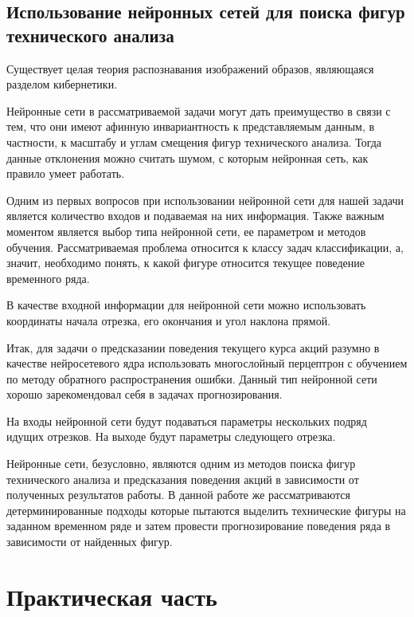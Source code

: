 \documentclass[bachelor, och, coursework]{SCWorks}
\begin{document}
        \subsection{Использование нейронных сетей для поиска фигур технического анализа}
        Существует целая теория распознавания изображений образов, являющаяся
        разделом кибернетики.

        Нейронные сети в рассматриваемой задачи могут дать преимущество в связи
        с тем, что они имеют афинную инвариантность к представляемым данным, в
        частности, к масштабу и углам смещения фигур технического анализа. Тогда
        данные отклонения можно считать шумом, с которым нейронная сеть, как
        правило умеет работать. 

        Одним из первых вопросов при использовании нейронной сети для нашей
        задачи является количество входов и подаваемая на них информация. Также
        важным моментом является выбор типа нейронной сети, ее параметром и
        методов обучения. Рассматриваемая проблема относится к классу задач
        классификации, а, значит, необходимо понять, к какой фигуре относится
        текущее поведение временного ряда.

        В качестве входной информации для нейронной сети можно использовать
        координаты начала отрезка, его окончания и угол наклона прямой. 

        Итак, для задачи о предсказании поведения текущего курса акций разумно в
        качестве нейросетевого ядра использовать многослойный перцептрон с
        обучением по методу обратного распространения ошибки. Данный тип
        нейронной сети хорошо зарекомендовал себя в задачах прогнозирования.

        На входы нейронной сети будут подаваться параметры нескольких подряд
        идущих отрезков. На выходе будут параметры следующего отрезка.
        
        Нейронные сети, безусловно, являются одним из методов поиска фигур
        технического анализа и предсказания поведения акций в зависимости от
        полученных результатов работы. В данной работе же рассматриваются
        детерминированные подходы которые пытаются выделить технические фигуры
        на заданном временном ряде и затем провести прогнозирование поведения
        ряда в зависимости от найденных фигур.


\section{Практическая часть}
\end{document}
